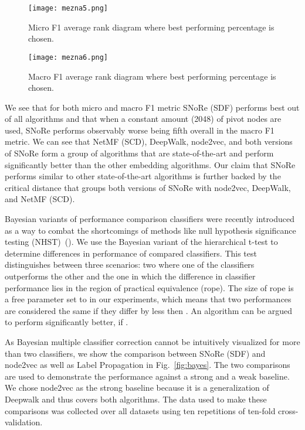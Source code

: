 \documentclass[twoside,11pt]{article}
\begin{document}
\begin{figure*}[t!]
  \centering
  \texttt{[image: mezna5.png]}
  \caption{Micro F1 average rank diagram where best performing percentage is chosen.}
  \label{fig:cdmicromax}
\end{figure*}

\begin{figure*}[t!]
  \centering
  \texttt{[image: mezna6.png]}
  \caption{Macro F1 average rank diagram where best performing percentage is chosen.}
  \label{fig:cdmacromax}
\end{figure*}

We see that for both micro and macro F1 metric SNoRe (SDF) performs best out of all algorithms and that when a constant amount (2048) of pivot nodes are used, SNoRe performs observably worse being fifth overall in the macro F1 metric. We can see that NetMF (SCD), DeepWalk, node2vec, and both versions of SNoRe form a group of algorithms that are state-of-the-art and perform significantly better than the other embedding algorithms. Our claim that SNoRe performs similar to other state-of-the-art algorithms is further backed by the critical distance that groups both versions of SNoRe with node2vec, DeepWalk, and NetMF (SCD).

Bayesian variants of performance comparison classifiers were recently introduced as a way to combat the shortcomings of methods like null hypothesis significance testing (NHST)~(\cite{benavoli2017bayes}). We use the Bayesian variant of the hierarchical t-test to determine differences in performance of compared classifiers. This test distinguishes between three scenarios: two where one of the classifiers outperforms the other and the one in which the difference in classifier performance lies in the region of practical equivalence (rope). The size of rope is a free parameter set to  in our experiments, which means that two performances are considered the same if they differ by less then . An algorithm can be argued to perform significantly better, if .

As Bayesian multiple classifier correction cannot be intuitively visualized for more than two classifiers, we show the comparison between SNoRe (SDF) and node2vec as well as Label Propagation in  Fig.~\ref{fig:bayes}. The two comparisons are used to demonstrate the performance against a strong and a weak baseline. We chose node2vec as the strong baseline because it is a generalization of Deepwalk and thus covers both algorithms. The data used to make these comparisons was collected over all datasets using ten repetitions of ten-fold cross-validation.
\end{document}
